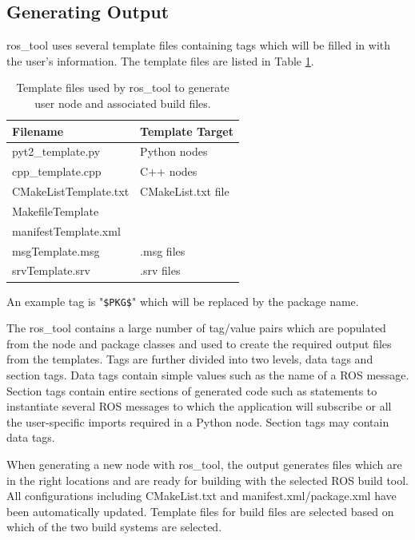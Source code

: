 \documentclass[letterpaper, 10 pt, conference]{ieeeconf}  %
\begin{document}
\subsection{Generating Output}

ros\_tool uses several template files containing tags which will be filled in with the user's information.    The template files are listed in Table \ref{tagtable}.

\begin{table}\centering
\begin{tabular}{ll}
Filename                                 & Template Target \\ \hline
pyt2\_template.py                   &  Python nodes \\
cpp\_template.cpp                   & C++ nodes \\
CMakeListTemplate.txt        &  CMakeList.txt file \\
MakefileTemplate\\
manifestTemplate.xml \\
msgTemplate.msg              & .msg files \\
srvTemplate.srv                & .srv files\\
\end{tabular}
\caption{Template files used by ros\_tool to generate user node and associated build files.}\label{tagtable}
\end{table}

An example tag is "{\tt \$PKG\$}" which will be replaced by the package name. 

The ros\_tool contains a large number of tag/value pairs which are populated from the node and package classes and used to create the required output files from the templates.   Tags are further divided into two levels, data tags and section tags.   Data tags contain simple values such as the name of a ROS message.  Section tags contain entire sections of generated code such as statements to instantiate several ROS messages to which the application will subscribe  or all the user-specific imports required in a Python node.  Section tags may contain data tags.    

When generating a new node with ros\_tool, the output generates files which are in the right locations and are ready for building with the selected ROS build tool.   All configurations including CMakeList.txt and manifest.xml/package.xml have been automatically updated. Template files for build files are selected based on which of the two build systems are selected.  
\end{document}
